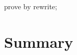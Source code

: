 \begin{LDCheck}\begin{zproof}
    prove by rewrite;
\end{zproof}\end{LDCheck}

\newpage
\section{Summary}\label{ch3.ps.summary}
\lpscriptsummary
